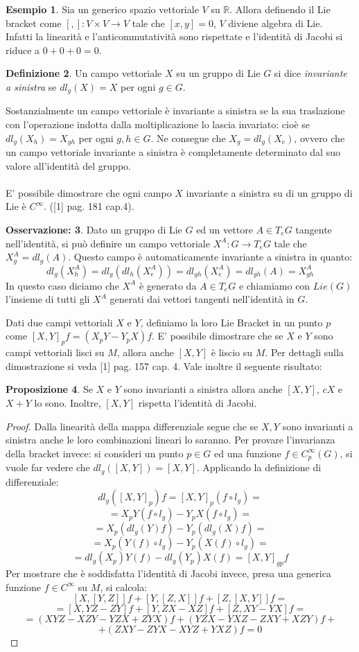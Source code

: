 \documentclass[12pt,a4paper]{report}
\theoremstyle{definition}
\newtheorem{Def}{Definizione}[chapter]
\theoremstyle{Theorem}
\newtheorem{Prop}[Def]{Proposizione}
\theoremstyle{definition}
\newtheorem{Ex}[Def]{Esempio}
\theoremstyle{definition}
\theoremstyle{definition}
\newtheorem{Obs}[Def]{Osservazione:}
\begin{document}
\begin{Ex}
	Sia un generico spazio vettoriale $V$ su $\mathbb{R}$. Allora definendo il Lie bracket come $[,]:V\times V\rightarrow V$ tale che $[x,y]=0$, $V$ diviene algebra di Lie.\\
	Infatti la linearità e l'anticommutatività sono rispettate e l'identità di Jacobi si riduce a $0+0+0=0$.
\end{Ex}
\begin{Def}
	Un campo vettoriale $X$ su un gruppo di Lie $G$ si dice \textit{invariante a sinistra} se $dl_g(X)=X$ per ogni $g\in G$.
\end{Def}
Sostanzialmente un campo vettoriale è invariante a sinistra se la sua traslazione con l'operazione indotta dalla moltiplicazione lo lascia invariato: cioè se $dl_g(X_h)=X_{gh}$ per ogni $g,h\in G$.
Ne consegue che $X_g=dl_g(X_e)$, ovvero che un campo vettoriale invariante a sinistra è completamente determinato dal suo valore all'identità del gruppo.\\
\\
E' possibile dimostrare che ogni campo $X$ invariante a sinistra su di un gruppo di Lie è $C^\infty$. ([1] pag. 181 cap.4).
\begin{Obs} \label{Obs: 2.2}
	Dato un gruppo di Lie $G$ ed un vettore $A\in T_eG$ tangente nell'identità, si può definire un campo vettoriale $X^A:G\rightarrow T_eG$ tale che $X^A_g=dl_g(A)$. Questo campo è automaticamente invariante a sinistra in quanto: $$dl_g(X^A_h)=dl_g(dl_h(X^A_e))=dl_{gh}(X^A_e)=dl_{gh}(A)=X^A_{gh}$$
	In questo caso diciamo che $X^A$ è generato da $A\in T_eG$ e chiamiamo con $Lie(G)$ l'insieme di tutti gli $X^A$ generati dai vettori tangenti nell'identità in $G$.	
\end{Obs}
Dati due campi vettoriali $X$ e $Y$, definiamo la loro Lie Bracket in un punto $p$ come $[X,Y]_pf=(X_pY-Y_pX)f$.
E' possibile dimostrare che se $X$ e $Y$ sono campi vettoriali lisci su $M$, allora anche $[X,Y]$ è liscio su $M$. Per dettagli sulla dimostrazione si veda [1] pag. 157 cap. 4.
Vale inoltre il seguente risultato:
\begin{Prop}
	Se $X$ e $Y$ sono invarianti a sinistra allora anche $[X,Y]$, $cX$ e $X+Y$ lo sono. Inoltre, $[X,Y]$ rispetta l'identità di Jacobi.
\end{Prop}
\begin{proof}
	Dalla linearità della mappa differenziale segue che se $X,Y$ sono invarianti a sinistra anche le loro combinazioni lineari lo saranno.
	Per provare l'invarianza della bracket invece: si consideri un punto $p\in G$ ed una funzione $f\in C^\infty_p(G)$, si vuole far vedere che $dl_g([X,Y])=[X,Y]$.
	Applicando la definizione di differenziale: $$dl_g([X,Y]_p)f=[X,Y]_p(f\circ l_g)=$$$$=X_pY(f\circ l_g)-Y_pX(f\circ l_g)=$$$$=X_p(dl_g(Y)f)-Y_p(dl_g(X)f)=$$
	$$=X_p(Y(f)\circ l_g)-Y_p(X(f)\circ l_g)=$$
	$$=dl_g(X_p)Y(f)-dl_g(Y_p)X(f)=[X,Y]_{gp}f$$ 
	Per mostrare che è soddisfatta l'identità di Jacobi invece, presa una generica funzione $f\in C^\infty$ su $M$, si calcola:
	$$[X,[Y,Z]]f+[Y,[Z,X]]f+[Z,[X,Y]]f=$$
	$$=[X,YZ-ZY]f+[Y,ZX-XZ]f+[Z,XY-YX]f=$$
	$$=(XYZ-XZY-YZX+ZYX)f+(YZX-YXZ-ZXY+XZY)f+$$$$+(ZXY-ZYX-XYZ+YXZ)f=0$$
\end{proof}
\end{document}
